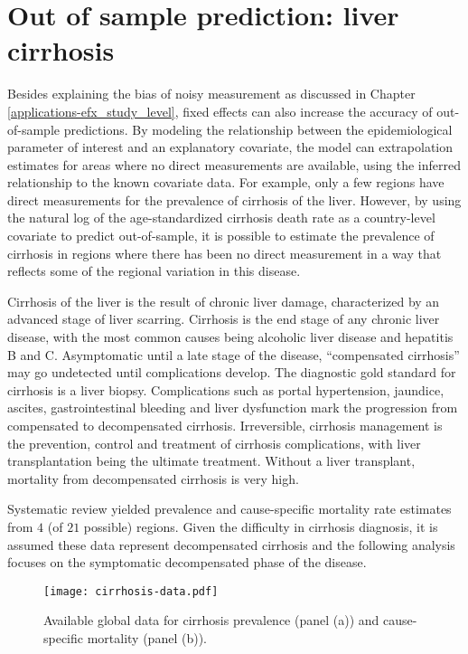 \chapter{Out of sample prediction: liver cirrhosis}
\label{applications-efx_country_level}

Besides explaining the bias of noisy measurement as discussed in
Chapter \ref{applications-efx_study_level}, fixed effects can also
increase the accuracy of out-of-sample predictions.  By modeling the
relationship between the epidemiological parameter of interest and an
explanatory covariate, the model can extrapolation estimates for areas
where no direct measurements are available, using the inferred
relationship to the known covariate data.  For example, only a few
regions have direct measurements for the prevalence of cirrhosis of
the liver.  However, by using the natural log of the age-standardized
cirrhosis death rate as a country-level covariate to predict
out-of-sample, it is possible to estimate the prevalence of cirrhosis
in regions where there has been no direct measurement in a way that
reflects some of the regional variation in this disease.

Cirrhosis of the liver is the result of chronic liver damage,
characterized by an advanced stage of liver scarring.  Cirrhosis is
the end stage of any chronic liver disease, with the most common
causes being alcoholic liver disease and hepatitis B and C.
Asymptomatic until a late stage of the disease, ``compensated
cirrhosis'' may go undetected until complications develop.  The
diagnostic gold standard for cirrhosis is a liver biopsy.
Complications such as portal hypertension, jaundice, ascites,
gastrointestinal bleeding and liver dysfunction mark the progression
from compensated to decompensated cirrhosis.  Irreversible, cirrhosis
management is the prevention, control and treatment of cirrhosis
complications, with liver transplantation being the ultimate
treatment.  Without a liver transplant, mortality from decompensated
cirrhosis is very high. \cite{garcia-tsao_management_2009,
  damico_natural_2006, schuppan_liver_2008}

Systematic review yielded prevalence and cause-specific mortality rate
estimates from $4$ (of $21$ possible) regions.  Given the difficulty in
cirrhosis diagnosis, it is assumed these data represent decompensated
cirrhosis and the following analysis focuses on the symptomatic
decompensated phase of the disease.

    \begin{figure}[h]
        \begin{center}
            \texttt{[image: cirrhosis-data.pdf]}
            \caption{Available global data for cirrhosis prevalence
              (panel (a)) and cause-specific mortality (panel (b)).}
            \label{fig:app-cirrhosis data}
        \end{center}
    \end{figure}

